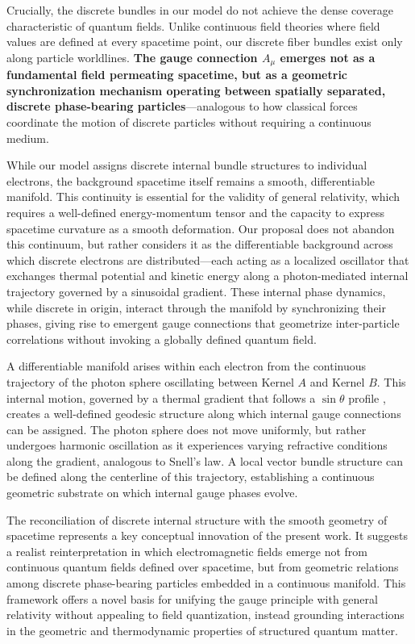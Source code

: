 \documentclass[%
 reprint,
 amsmath,amssymb,
 aps,
]{revtex4-1}
\numberwithin{equation}{section}%
\begin{document}
Crucially, the discrete bundles in our model do not achieve the dense coverage characteristic of quantum fields. Unlike continuous field theories where field values are defined at every spacetime point, our discrete fiber bundles exist only along particle worldlines. \textbf{The gauge connection $A_\mu$ emerges not as a fundamental field permeating spacetime, but as a geometric synchronization mechanism operating between spatially separated, discrete phase-bearing particles}—analogous to how classical forces coordinate the motion of discrete particles without requiring a continuous medium.

While our model assigns discrete internal bundle structures to individual electrons, the background spacetime itself remains a smooth, differentiable manifold. This continuity is essential for the validity of general relativity, which requires a well-defined energy-momentum tensor and the capacity to express spacetime curvature as a smooth deformation. Our proposal does not abandon this continuum, but rather considers it as the differentiable background across which discrete electrons are distributed---each acting as a localized oscillator that exchanges thermal potential and kinetic energy along a photon-mediated internal trajectory governed by a sinusoidal gradient. These internal phase dynamics, while discrete in origin, interact through the manifold by synchronizing their phases, giving rise to emergent gauge connections that geometrize inter-particle correlations without invoking a globally defined quantum field.

A differentiable manifold arises within each electron from the continuous trajectory of the photon sphere oscillating between Kernel $A$ and Kernel $B$. This internal motion, governed by a thermal gradient that follows a $\sin\theta$ profile \cite{hanamura2018}, creates a well-defined geodesic structure along which internal gauge connections can be assigned. The photon sphere does not move uniformly, but rather undergoes harmonic oscillation as it experiences varying refractive conditions along the gradient, analogous to Snell's law. A local vector bundle structure can be defined along the centerline of this trajectory, establishing a continuous geometric substrate on which internal gauge phases evolve.

The reconciliation of discrete internal structure with the smooth geometry of spacetime represents a key conceptual innovation of the present work. It suggests a realist reinterpretation in which electromagnetic fields emerge not from continuous quantum fields defined over spacetime, but from geometric relations among discrete phase-bearing particles embedded in a continuous manifold. This framework offers a novel basis for unifying the gauge principle with general relativity without appealing to field quantization, instead grounding interactions in the geometric and thermodynamic properties of structured quantum matter.
\end{document}
